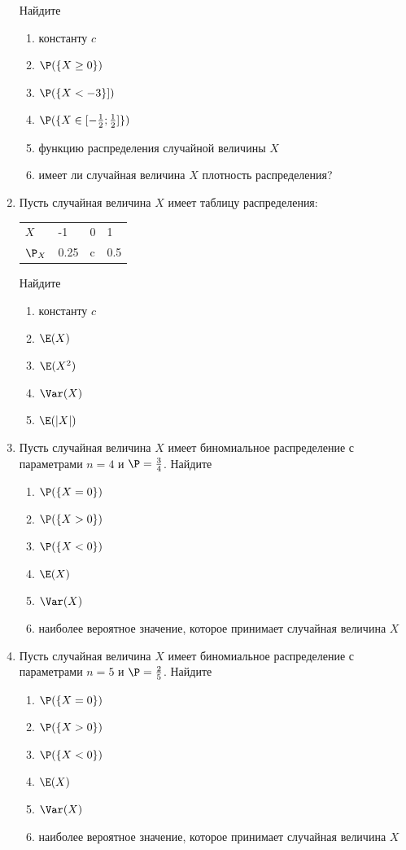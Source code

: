 \begin{enumerate}
Найдите
	\begin{enumerate}
	\item константу $c$
	\item $\P(\{X \geq 0\})$
	\item $\P(\{X < -3\}])$
	\item $\P(\{X \in [-\frac{1}{2}; \frac{1}{2}]\})$
	\item функцию распределения случайной величины $X$
	\item имеет ли случайная величина $X$ плотность распределения?
\end{enumerate}

\item  Пусть случайная величина $X$ имеет таблицу распределения:

\begin{tabular}{ l l l l}
  \toprule
$X$ & -1  & 0  & 1 \\
$\P_X$ & 0.25  & c  & 0.5 \\
\bottomrule
\end{tabular}

Найдите
\begin{enumerate}
	\item константу $c$
	\item $\E(X)$
	\item $\E(X^2)$
	\item $\Var(X)$
	\item $\E(|X|)$
\end{enumerate}

\item Пусть случайная величина $X$ имеет биномиальное распределение с
параметрами $n = 4$ и $\P = \frac{3}{4}$.
 Найдите
\begin{enumerate}
	\item $\P(\{X = 0\})$
	\item $\P(\{X > 0\})$
	\item $\P(\{X < 0\})$
	\item $\E(X)$
	\item $\Var(X)$
	\item  наиболее вероятное значение, которое принимает случайная величина $X$
\end{enumerate}

\item Пусть случайная величина $X$ имеет биномиальное распределение с
параметрами $n = 5$ и $\P = \frac{2}{5}$.
Найдите
\begin{enumerate}
	\item $\P(\{X = 0\})$
	\item $\P(\{X > 0\})$
	\item $\P(\{X < 0\})$
	\item $\E(X)$
	\item $\Var(X)$
	\item  наиболее вероятное значение, которое принимает случайная величина $X$
\end{enumerate}



\end{enumerate}
